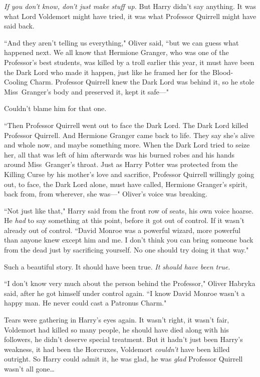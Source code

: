 \emph{If you don't know, don't just make stuff up.} But Harry didn't say anything. It was what Lord Voldemort might have tried, it was what Professor Quirrell might have said back.

``And they aren't telling us everything," Oliver said, ``but we can guess what happened next. We all know that Hermione Granger, who was one of the Professor's best students, was killed by a troll earlier this year, it must have been the Dark Lord who made it happen, just like he framed her for the Blood-Cooling Charm. Professor Quirrell knew the Dark Lord was behind it, so he stole Miss~Granger's body and preserved it, kept it safe—"

Couldn't blame him for that one.

``Then Professor Quirrell went out to face the Dark Lord. The Dark Lord killed Professor Quirrell. And Hermione Granger came back to life. They say she's alive and whole now, and maybe something more. When the Dark Lord tried to seize her, all that was left of him afterwards was his burned robes and his hands around Miss~Granger's throat. Just as Harry Potter was protected from the Killing Curse by his mother's love and sacrifice, Professor Quirrell willingly going out, to face, the Dark Lord alone, must have called, Hermione Granger's spirit, back from, from wherever, she was—" Oliver's voice was breaking.

``Not just like that," Harry said from the front row of seats, his own voice hoarse. He \emph{had} to say something at this point, before it got out of control. If it wasn't already out of control. ``David Monroe was a powerful wizard, more powerful than anyone knew except him and me. I don't think you can bring someone back from the dead just by sacrificing yourself. No one should try doing it that way."

Such a beautiful story. It should have been true. \emph{It should have been true.}

``I don't know very much about the person behind the Professor," Oliver Habryka said, after he got himself under control again. ``I know David Monroe wasn't a happy man. He never could cast a Patronus Charm."

Tears were gathering in Harry's eyes again. It wasn't right, it wasn't fair, Voldemort had killed so many people, he should have died along with his followers, he didn't deserve special treatment. But it hadn't just been Harry's weakness, it had been the Horcruxes, Voldemort \emph{couldn't} have been killed outright. So Harry could admit it, he was glad, he was \emph{glad} Professor Quirrell wasn't all gone{\ldots}

